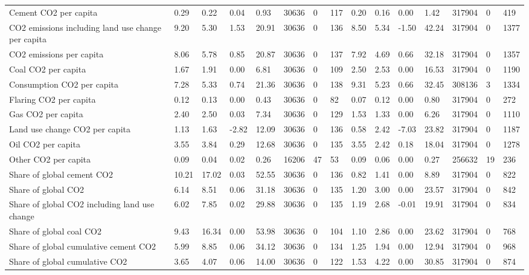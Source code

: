 \begin{longtable}{lllllllllllllll}
Cement CO2 per capita & 0.29 & 0.22 & 0.04 & 0.93 & 30636 & 0 & 117 & 0.20 & 0.16 & 0.00 & 1.42 & 317904 & 0 & 419\\
CO2 emissions including land use change per capita & 9.20 & 5.30 & 1.53 & 20.91 & 30636 & 0 & 136 & 8.50 & 5.34 & -1.50 & 42.24 & 317904 & 0 & 1377\\
CO2 emissions per capita & 8.06 & 5.78 & 0.85 & 20.87 & 30636 & 0 & 137 & 7.92 & 4.69 & 0.66 & 32.18 & 317904 & 0 & 1357\\
Coal CO2 per capita & 1.67 & 1.91 & 0.00 & 6.81 & 30636 & 0 & 109 & 2.50 & 2.53 & 0.00 & 16.53 & 317904 & 0 & 1190\\
\addlinespace
Consumption CO2 per capita & 7.28 & 5.33 & 0.74 & 21.36 & 30636 & 0 & 138 & 9.31 & 5.23 & 0.66 & 32.45 & 308136 & 3 & 1334\\
Flaring CO2 per capita & 0.12 & 0.13 & 0.00 & 0.43 & 30636 & 0 & 82 & 0.07 & 0.12 & 0.00 & 0.80 & 317904 & 0 & 272\\
Gas CO2 per capita & 2.40 & 2.50 & 0.03 & 7.34 & 30636 & 0 & 129 & 1.53 & 1.33 & 0.00 & 6.26 & 317904 & 0 & 1110\\
Land use change CO2 per capita & 1.13 & 1.63 & -2.82 & 12.09 & 30636 & 0 & 136 & 0.58 & 2.42 & -7.03 & 23.82 & 317904 & 0 & 1187\\
Oil CO2 per capita & 3.55 & 3.84 & 0.29 & 12.68 & 30636 & 0 & 135 & 3.55 & 2.42 & 0.18 & 18.04 & 317904 & 0 & 1278\\
\addlinespace
Other CO2 per capita & 0.09 & 0.04 & 0.02 & 0.26 & 16206 & 47 & 53 & 0.09 & 0.06 & 0.00 & 0.27 & 256632 & 19 & 236\\
Share of global cement CO2 & 10.21 & 17.02 & 0.03 & 52.55 & 30636 & 0 & 136 & 0.82 & 1.41 & 0.00 & 8.89 & 317904 & 0 & 822\\
Share of global CO2 & 6.14 & 8.51 & 0.06 & 31.18 & 30636 & 0 & 135 & 1.20 & 3.00 & 0.00 & 23.57 & 317904 & 0 & 842\\
Share of global CO2 including land use change & 6.02 & 7.85 & 0.02 & 29.88 & 30636 & 0 & 135 & 1.19 & 2.68 & -0.01 & 19.91 & 317904 & 0 & 834\\
Share of global coal CO2 & 9.43 & 16.34 & 0.00 & 53.98 & 30636 & 0 & 104 & 1.10 & 2.86 & 0.00 & 23.62 & 317904 & 0 & 768\\
\addlinespace
Share of global cumulative cement CO2 & 5.99 & 8.85 & 0.06 & 34.12 & 30636 & 0 & 134 & 1.25 & 1.94 & 0.00 & 12.94 & 317904 & 0 & 968\\
Share of global cumulative CO2 & 3.65 & 4.07 & 0.06 & 14.00 & 30636 & 0 & 122 & 1.53 & 4.22 & 0.00 & 30.85 & 317904 & 0 & 874\\

\end{longtable}
